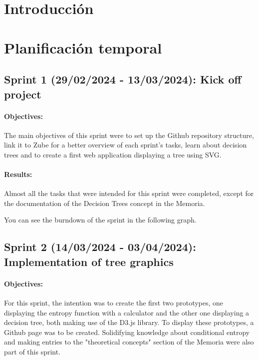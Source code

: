 
\section{Introducción}

\section{Planificación temporal}
\subsection{Sprint 1 (29/02/2024 - 13/03/2024): Kick off project}
\paragraph{Objectives:}
The main objectives of this sprint were to set up the Github repository structure, link it to Zube for a better overview of each sprint's tasks, learn about decision trees and to create a first web application displaying a tree using SVG.

\paragraph{Results:}
Almost all the tasks that were intended for this sprint were completed, except for the documentation of the Decision Trees concept in the Memoria.

You can see the burndown of the sprint in the following graph.


\subsection{Sprint 2 (14/03/2024 - 03/04/2024): Implementation of tree graphics}
\paragraph{Objectives:}
For this sprint, the intention was to create the first two prototypes, one displaying the entropy function with a calculator and the other one displaying a decision tree, both making use of the D3.js library. To display these prototypes, a Github page was to be created. Solidifying knowledge about conditional entropy and making entries to the "theoretical concepts" section of the Memoria were also part of this sprint. 

